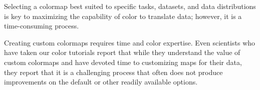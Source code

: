 \documentclass{IEEEcsmag}
\newcommand*{\km}[1]{\textcolor{km}{\emph{\textbf{#1} -- KM}}}
\newcommand*{\fs}[1]{\textcolor{fs}{\emph{\textbf{#1} -- FS}}}
\begin{document}







Selecting a colormap best suited to specific tasks, datasets, and data distributions is key to maximizing the capability of color to translate data; however, it is a time-consuming process.

Creating custom colormaps requires time and color expertise. Even scientists who have taken our color tutorials report that while they understand the value of custom colormaps and have devoted time to customizing maps for their data, they report that it is a challenging process that often does not produce improvements on the default or other readily available options.


\end{document}
